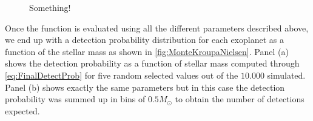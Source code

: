 \begin{figure}[!ht]
\centering
\caption{\scriptsize{Something!}}
\label{fig:RMInterpol}
\end{figure}

Once the function is evaluated using all the different parameters described above, we end up with a detection probability distribution for each exoplanet as a function of the stellar mass as shown in \autoref{fig:MonteKroupaNielsen}. Panel (a) shows the detection probability as a function of stellar mass computed through \autoref{eq:FinalDetectProb} for five random selected values out of the $10.000$ simulated. Panel (b) shows exactly the same parameters but in this case the detection probability was summed up in bins of $0.5M_\odot$ to obtain the number of detections expected.\\ 

